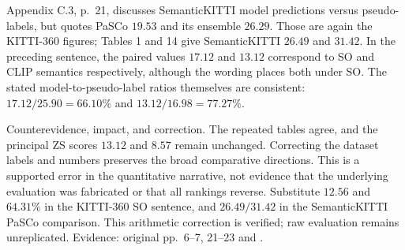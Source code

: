 \documentclass[10pt]{article}
\begin{document}
Appendix C.3, p. 21, discusses SemanticKITTI model predictions versus pseudo-labels, but quotes PaSCo \(19.53\) and its ensemble \(26.29\). Those are again the KITTI-360 figures; Tables 1 and 14 give SemanticKITTI \(26.49\) and \(31.42\). In the preceding sentence, the paired values \(17.12\) and \(13.12\) correspond to SO and CLIP semantics respectively, although the wording places both under SO. The stated model-to-pseudo-label ratios themselves are consistent: \(17.12/25.90=66.10\%\) and \(13.12/16.98=77.27\%\).\par
Counterevidence, impact, and correction. The repeated tables agree, and the principal ZS scores \(13.12\) and \(8.57\) remain unchanged. Correcting the dataset labels and numbers preserves the broad comparative directions. This is a supported error in the quantitative narrative, not evidence that the underlying evaluation was fabricated or that all rankings reverse. Substitute \(12.56\) and \(64.31\%\) in the KITTI-360 SO sentence, and \(26.49/31.42\) in the SemanticKITTI PaSCo comparison. This arithmetic correction is verified; raw evaluation remains unreplicated. Evidence: original pp. 6–7, 21–23 and .\par
\end{document}
